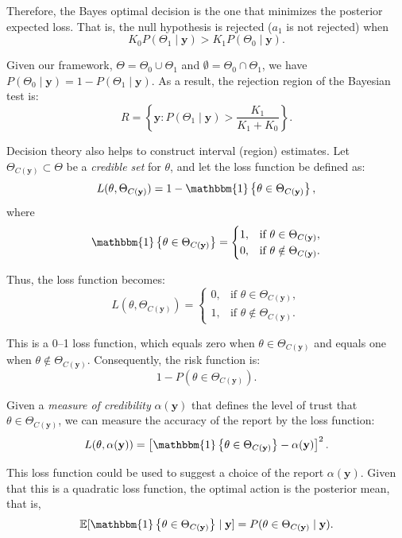 Therefore, the Bayes optimal decision is the one that minimizes the posterior expected loss. That is, the null hypothesis is rejected ($a_1$ is not rejected) when
\[
K_0 P(\Theta_1 \mid \mathbf{y}) > K_1 P(\Theta_0 \mid \mathbf{y}).
\]

Given our framework, $\Theta = \Theta_0 \cup \Theta_1$ and $\emptyset = \Theta_0 \cap \Theta_1$, we have $P(\Theta_0 \mid \mathbf{y}) = 1 - P(\Theta_1 \mid \mathbf{y})$. As a result, the rejection region of the Bayesian test is:
\[
R = \left\{ \mathbf{y}: P(\Theta_1 \mid \mathbf{y}) > \frac{K_1}{K_1 + K_0} \right\}.
\]

Decision theory also helps to construct interval (region) estimates. Let $\Theta_{C(\mathbf{y})} \subset \Theta$ be a \textit{credible set} for $\theta$, and let the loss function be defined as:
\[
L(\theta, \Theta_{C(\mathbf{y})}) = 1 - \mathbbm{1}\left\{\theta \in \Theta_{C(\mathbf{y})}\right\},
\]
where
\[
\mathbbm{1}\left\{\theta \in \Theta_{C(\mathbf{y})}\right\} = \begin{cases} 
	1, & \text{if } \theta \in \Theta_{C(\mathbf{y})}, \\
	0, & \text{if } \theta \notin \Theta_{C(\mathbf{y})}.
\end{cases}
\]

Thus, the loss function becomes:
\[
L(\theta, \Theta_{C(\mathbf{y})}) = \begin{cases} 
	0, & \text{if } \theta \in \Theta_{C(\mathbf{y})}, \\
	1, & \text{if } \theta \notin \Theta_{C(\mathbf{y})}.
\end{cases}
\]

This is a 0--1 loss function, which equals zero when $\theta \in \Theta_{C(\mathbf{y})}$ and equals one when $\theta \notin \Theta_{C(\mathbf{y})}$. Consequently, the risk function is:
\[
1 - P(\theta \in \Theta_{C(\mathbf{y})}).
\]

Given a \textit{measure of credibility} $\alpha(\mathbf{y})$ that defines the level of trust that $\theta \in \Theta_{C(\mathbf{y})}$, we can measure the accuracy of the report by the loss function:
\[
L(\theta, \alpha(\mathbf{y})) = \left[\mathbbm{1}\left\{\theta \in \Theta_{C(\mathbf{y})}\right\} - \alpha(\mathbf{y})\right]^2.
\]

This loss function could be used to suggest a choice of the report $\alpha(\mathbf{y})$. Given that this is a quadratic loss function, the optimal action is the posterior mean, that is,
\[
\mathbb{E}[\mathbbm{1}\left\{\theta \in \Theta_{C(\mathbf{y})}\right\} \mid \mathbf{y}] = P(\theta \in \Theta_{C(\mathbf{y})} \mid \mathbf{y}).
\]

